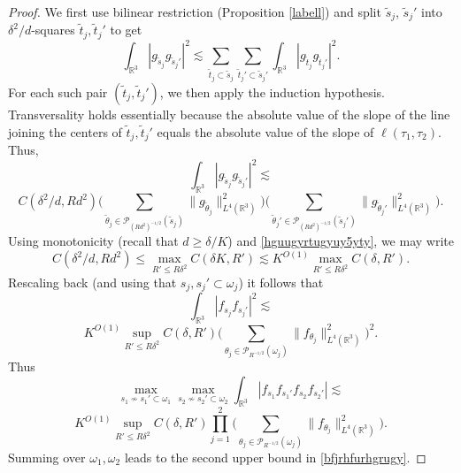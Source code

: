 \documentclass{amsart}%
\numberwithin{equation}{section}
\newcommand{\cP}{\mathcal P}
\newcommand{\R}{\mathbb{R}}
\newcommand{\1}{\mathbbm{1}}
\begin{document}
\begin{proof}
		We first use bilinear restriction (Proposition \ref{labell}) and split $\tilde{s}_j$, $\tilde{s}_j'$ into $\delta^2/d$-squares $\tilde{t}_j,\tilde{t}_j'$ to get
		$$\int_{\R^3}|g_{\tilde{s}_j}g_{\tilde{s}_j'}|^2\lesssim \sum_{\tilde{t}_j\subset\tilde{s}_j}\sum_{\tilde{t}_j'\subset\tilde{s}_j'}\int_{\R^3}|g_{\tilde{t}_j}g_{\tilde{t}_j'}|^2.$$ 
		For each such pair $(\tilde{t}_j,\tilde{t}_j')$,  we then apply the induction hypothesis. Transversality holds essentially because the absolute value of the slope of the line joining the centers of $\tilde{t}_j,\tilde{t}_j'$	equals the absolute value of the slope of $\ell(\tau_1,\tau_2)$.
        Thus,
		$$\int_{\R^3}|g_{\tilde{s}_j}g_{\tilde{s}_j'}|^2\lesssim $$$$C(\delta^2/d, Rd^2)\Big(\sum_{\tilde{\theta}_j\in \cP_{(Rd^2)^{-1/2}}(\tilde{s}_j)}\big\|g_{\tilde{\theta}_j}\big\|_{L^4(\R^3)}^2\Big)\Big(\sum_{\tilde{\theta}_j'\in \cP_{(Rd^2)^{-1/2}}(\tilde{s}_j')}\big\|g_{\tilde{\theta}_j'}\big\|_{L^4(\R^3)}^2\Big).$$
		Using monotonicity (recall that $d\ge \delta/K$) and \eqref{hguugyrtugyuy5yty}, we may write $$C(\delta^2/d, Rd^2)\le \max_{R'\le R\delta^2}C(\delta K,R')\lesssim K^{O(1)}\max_{R'\le R\delta^2}C(\delta ,R').$$		 Rescaling back (and using that $s_j,s_j'\subset \omega_j$) it follows that
		$$\int_{\R^3}|f_{s_j}f_{s_j'}|^2\lesssim$$$$
		K^{O(1)}\sup_{R'\le R\delta^2}C(\delta , R')\Big(\sum_{{\theta}_j\in \cP_{R^{-1/2}}({\omega}_j)}\big\|f_{{\theta}_j}\big\|_{L^4(\R^3)}^2\Big)^2.$$
		Thus $$\max_{s_1\not\sim s_{1}'\subset \omega_1}\max_{s_2\not\sim s_{2}'\subset \omega_2}\int_{\R^3} |f_{s_1}f_{s_1'}f_{s_2}f_{s_2'}|\lesssim $$
		$$K^{O(1)}\sup_{R'\le R\delta^2}C(\delta , R')\prod_{j=1}^2\Big(\sum_{{\theta}_j\in \cP_{R^{-1/2}}({\omega}_j)}\big\|f_{{\theta}_j}\big\|_{L^4(\R^3)}^2\Big).$$ Summing over $\omega_1, \omega_2$ leads to the second upper bound in \eqref{bfjrhfurhgrugy}. \qedhere
		
	\end{proof}
    \medskip 
\end{document}
